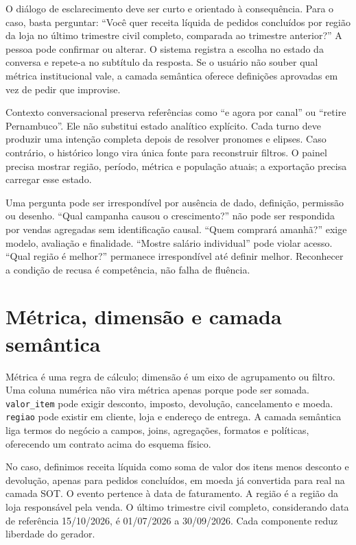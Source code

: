 O diálogo de esclarecimento deve ser curto e orientado à consequência. Para o caso, basta perguntar: ``Você quer receita líquida de pedidos concluídos por região da loja no último trimestre civil completo, comparada ao trimestre anterior?'' A pessoa pode confirmar ou alterar. O sistema registra a escolha no estado da conversa e repete-a no subtítulo da resposta. Se o usuário não souber qual métrica institucional vale, a camada semântica oferece definições aprovadas em vez de pedir que improvise.

Contexto conversacional preserva referências como ``e agora por canal'' ou ``retire Pernambuco''. Ele não substitui estado analítico explícito. Cada turno deve produzir uma intenção completa depois de resolver pronomes e elipses. Caso contrário, o histórico longo vira única fonte para reconstruir filtros. O painel precisa mostrar região, período, métrica e população atuais; a exportação precisa carregar esse estado.

Uma pergunta pode ser irrespondível por ausência de dado, definição, permissão ou desenho. ``Qual campanha causou o crescimento?'' não pode ser respondida por vendas agregadas sem identificação causal. ``Quem comprará amanhã?'' exige modelo, avaliação e finalidade. ``Mostre salário individual'' pode violar acesso. ``Qual região é melhor?'' permanece irrespondível até definir melhor. Reconhecer a condição de recusa é competência, não falha de fluência.

\section{Métrica, dimensão e camada semântica}

Métrica é uma regra de cálculo; dimensão é um eixo de agrupamento ou filtro. Uma coluna numérica não vira métrica apenas porque pode ser somada. \texttt{valor\_item} pode exigir desconto, imposto, devolução, cancelamento e moeda. \texttt{regiao} pode existir em cliente, loja e endereço de entrega. A camada semântica liga termos do negócio a campos, joins, agregações, formatos e políticas, oferecendo um contrato acima do esquema físico.

No caso, definimos receita líquida como soma de valor dos itens menos desconto e devolução, apenas para pedidos concluídos, em moeda já convertida para real na camada SOT. O evento pertence à data de faturamento. A região é a região da loja responsável pela venda. O último trimestre civil completo, considerando data de referência 15/10/2026, é 01/07/2026 a 30/09/2026. Cada componente reduz liberdade do gerador.

